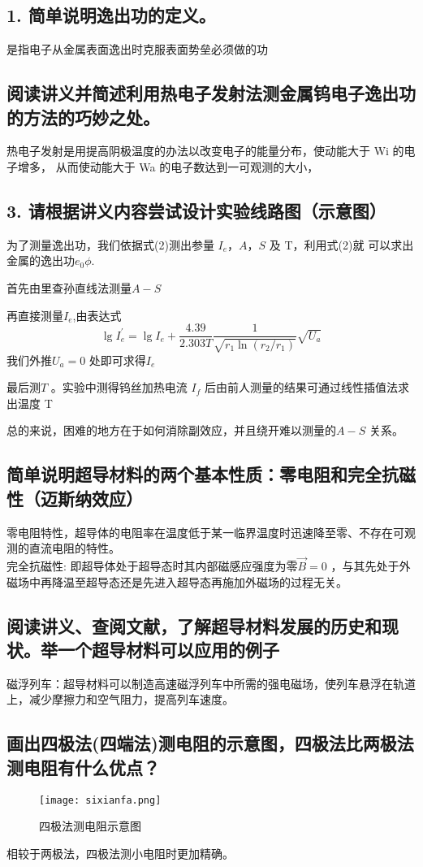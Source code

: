 \documentclass[12pt, a4paper, oneside]{ctexbook}
\begin{document}
\subsection*{1. 简单说明逸出功的定义。}
是指电子从金属表面逸出时克服表面势垒必须做的功
\subsection*{阅读讲义并简述利用热电子发射法测金属钨电子逸出功的方法的巧妙之处。}
热电子发射是用提高阴极温度的办法以改变电子的能量分布，使动能大于 Wi 的电子增多，
从而使动能大于 Wa 的电子数达到一可观测的大小，
\subsection*{3. 请根据讲义内容尝试设计实验线路图（示意图）}
为了测量逸出功，我们依据式(2)测出参量 $ I_e，A，S  $ 及 T，利用式(2)就
可以求出金属的逸出功$  e_0\phi $.

首先由里查孙直线法测量$ A-S $

再直接测量$ I_e $,由表达式$$
    \lg I^{\prime}_{e}=\lg I_{e}+\frac{4.39}{2.303 T} \frac{1}{\sqrt{r_{1} \ln \left(r_{2} / r_{1}\right)}} \sqrt{U_{a}}
$$
我们外推$ U_a=0 $ 处即可求得$ I_e $

最后测$ T $ 。实验中测得钨丝加热电流 $ I_f $  后由前人测量的结果可通过线性插值法求出温度 T

总的来说，困难的地方在于如何消除副效应，并且绕开难以测量的$ A-S $ 关系。

\newpage
\subsection*{简单说明超导材料的两个基本性质：零电阻和完全抗磁性（迈斯纳效应）}
零电阻特性，超导体的电阻率在温度低于某一临界温度时迅速降至零、不存在可观测的直流电阻的特性。\\
完全抗磁性: 即超导体处于超导态时其内部磁感应强度为零$ \vec{B} = 0 $ ，与其先处于外磁场中再降温至超导态还是先进入超导态再施加外磁场的过程无关。
\subsection*{ 阅读讲义、查阅文献，了解超导材料发展的历史和现状。举一个超导材料可以应用的例子}
磁浮列车：超导材料可以制造高速磁浮列车中所需的强电磁场，使列车悬浮在轨道上，减少摩擦力和空气阻力，提高列车速度。

\subsection*{画出四极法(四端法)测电阻的示意图，四极法比两极法测电阻有什么优点？}
\begin{figure}[!h]
    \centering
    \caption{四极法测电阻示意图}
    \texttt{[image: sixianfa.png]}
\end{figure}
相较于两极法，四极法测小电阻时更加精确。
\end{document}
